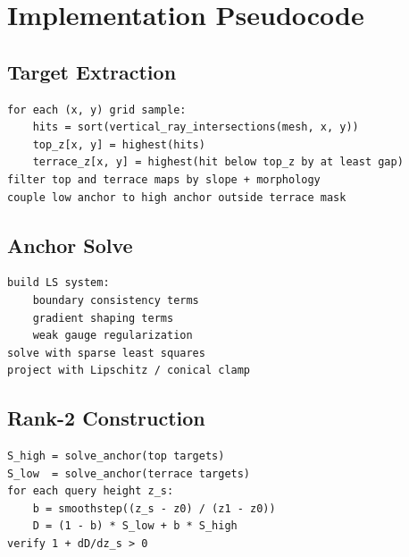 \appendix
\section{Implementation Pseudocode}

\subsection{Target Extraction}

\begin{verbatim}
for each (x, y) grid sample:
    hits = sort(vertical_ray_intersections(mesh, x, y))
    top_z[x, y] = highest(hits)
    terrace_z[x, y] = highest(hit below top_z by at least gap)
filter top and terrace maps by slope + morphology
couple low anchor to high anchor outside terrace mask
\end{verbatim}

\subsection{Anchor Solve}

\begin{verbatim}
build LS system:
    boundary consistency terms
    gradient shaping terms
    weak gauge regularization
solve with sparse least squares
project with Lipschitz / conical clamp
\end{verbatim}

\subsection{Rank-2 Construction}

\begin{verbatim}
S_high = solve_anchor(top targets)
S_low  = solve_anchor(terrace targets)
for each query height z_s:
    b = smoothstep((z_s - z0) / (z1 - z0))
    D = (1 - b) * S_low + b * S_high
verify 1 + dD/dz_s > 0
\end{verbatim}
